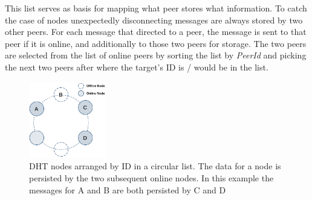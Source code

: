 This list serves as basis for mapping what peer stores what information.
To catch the case of nodes unexpectedly disconnecting messages are always stored by two other peers.
For each message that directed to a peer, the message is sent to that peer if it is online, and additionally to those two peers for storage.
The two peers are selected from the list of online peers by sorting the list by \textit{PeerId} and picking the next two peers after where the target's ID is / would be in the list.


\begin{figure}
    \centering
    \includegraphics[width=0.3\textwidth]{assets/dht.png}
    \caption{DHT nodes arranged by ID in a circular list. The data for a node is persisted by the two subsequent online nodes. In this example the messages for A and B are both persisted by C and D}
    \label{fig:dht}
\end{figure}

